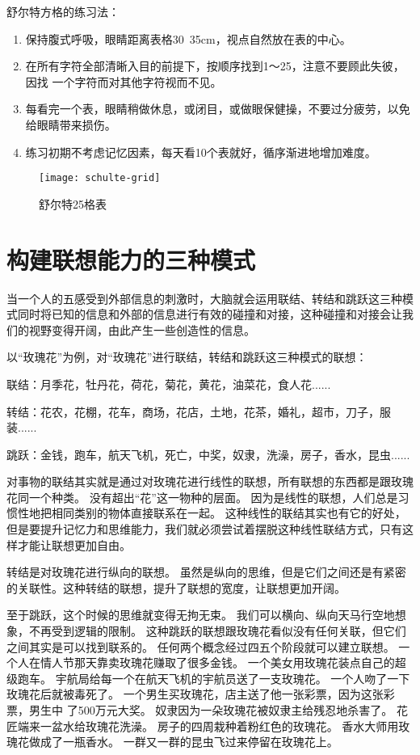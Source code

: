 \begin{itemize}
  舒尔特方格的练习法：
  \begin{enumerate}
  \item 保持腹式呼吸，眼睛距离表格30~35cm，视点自然放在表的中心。
  \item 在所有字符全部清晰入目的前提下，按顺序找到1～25，注意不要顾此失彼，因找 一个字符而对其他字符视而不见。
  \item 每看完一个表，眼睛稍做休息，或闭目，或做眼保健操，不要过分疲劳，以免给眼睛带来损伤。
  \item 练习初期不考虑记忆因素，每天看10个表就好，循序渐进地增加难度。
  \end{enumerate}
\end{itemize}

\begin{figure}[!htbp]
  \centering
  \texttt{[image: schulte-grid]}
  \caption{舒尔特25格表}
  \label{fig:schulte-grid}
\end{figure}


\section{构建联想能力的三种模式}

当一个人的五感受到外部信息的刺激时，大脑就会运用联结、转结和跳跃这三种模式同时将已知的信息和外部的信息进行有效的碰撞和对接，这种碰撞和对接会让我们的视野变得开阔，由此产生一些创造性的信息。


以“玫瑰花”为例，对“玫瑰花”进行联结，转结和跳跃这三种模式的联想：

联结：月季花，牡丹花，荷花，菊花，黄花，油菜花，食人花......

转结：花农，花棚，花车，商场，花店，土地，花茶，婚礼，超市，刀子，服装......

跳跃：金钱，跑车，航天飞机，死亡，中奖，奴隶，洗澡，房子，香水，昆虫......

对事物的联结其实就是通过对玫瑰花进行线性的联想，所有联想的东西都是跟玫瑰花同一个种类。
没有超出“花”这一物种的层面。
因为是线性的联想，人们总是习惯性地把相同类别的物体直接联系在一起。
这种线性的联结其实也有它的好处，但是要提升记忆力和思维能力，我们就必须尝试着摆脱这种线性联结方式，只有这样才能让联想更加自由。

转结是对玫瑰花进行纵向的联想。
虽然是纵向的思维，但是它们之间还是有紧密的关联性。这种转结的联想，提升了联想的宽度，让联想更加开阔。

至于跳跃，这个时候的思维就变得无拘无束。
我们可以横向、纵向天马行空地想象，不再受到逻辑的限制。
这种跳跃的联想跟玫瑰花看似没有任何关联，但它们之间其实是可以找到联系的。
任何两个概念经过四五个阶段就可以建立联想。
一个人在情人节那天靠卖玫瑰花赚取了很多金钱。
一个美女用玫瑰花装点自己的超级跑车。
宇航局给每一个在航天飞机的宇航员送了一支玫瑰花。
一个人吻了一下玫瑰花后就被毒死了。
一个男生买玫瑰花，店主送了他一张彩票，因为这张彩票，男生中 了500万元大奖。
奴隶因为一朵玫瑰花被奴隶主给残忍地杀害了。
花匠端来一盆水给玫瑰花洗澡。
房子的四周栽种着粉红色的玫瑰花。
香水大师用玫瑰花做成了一瓶香水。
一群又一群的昆虫飞过来停留在玫瑰花上。

